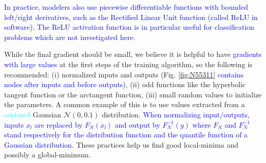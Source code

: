 \textcolor{blue}{In practice, modelers also use piecewise differentiable functions
with bounded left/right derivatives, such as the 
Rectified Linear Unit function (called ReLU in software).
The ReLU activation function is in particular useful for classification problems
which are not investigated here.}

While the final gradient should be small, we believe it is helpful to
have \textcolor{blue}{gradients with large values} at the first steps of
the training algorithm, so the following is recommended: (i) normalized
inputs and outputs (Fig. \ref{fig:N55311}
\textcolor{blue}{contains  nodes after inputs and before outputs}),
(ii) odd functions like the hyperbolic tangent function or the
arctangent function, (iii) small random values to initialize the
parameters. A common example of this is to use values extracted from a
\textcolor{cyan}{centered} Gaussian \(\mathcal N(0, 0.1)\) distribution.
\textcolor{blue}{When normalizing input/outputs, inputs $x_l$ are replaced
by $F_N(x_l)$ and output by $F_N^{-1}(y)$ where $F_N$ and $F_N^{-1}$
stand respectively for the distribution function and the quantile function
of a Gaussian distribution.} These practices help us find good
local-minima and possibly a global-minimum.

